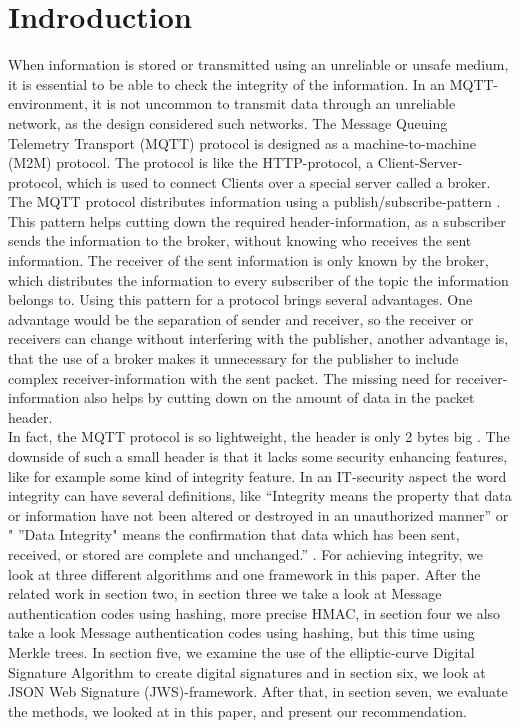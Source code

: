 \section{Indroduction}

When information is stored or transmitted using an unreliable or unsafe medium, it is essential to be able to check the integrity of the information. In an MQTT-environment, it is not uncommon to transmit data through an unreliable network, as the design considered such networks. The Message Queuing Telemetry Transport (MQTT) protocol is designed as a machine-to-machine (M2M) protocol. The protocol is like the HTTP-protocol, a Client-Server-protocol, which is used to connect Clients over a special server called a broker. The MQTT protocol distributes information using a publish/subscribe-pattern \cite{LIMI}. This pattern helps cutting down the required header-information, as a subscriber sends the information to the broker, without knowing who receives the sent information. The receiver of the sent information is only known by the broker, which distributes the information to every subscriber of the topic the information belongs to. Using this pattern for a protocol brings several advantages. One advantage would be the separation of sender and receiver, so the receiver or receivers can change without interfering with the publisher, another advantage is, that the use of a broker makes it unnecessary for the publisher to include complex receiver-information with the sent packet. The missing need for receiver-information also helps by cutting down on the amount of data in the packet header. \\
In fact, the MQTT protocol is so lightweight, the header is only 2 bytes big \cite{IBM}. The downside of such a small header is that it lacks some security enhancing features, like for example some kind of integrity feature. In an IT-security aspect the word integrity can have several definitions, like “Integrity means the property that data or information have not been altered or destroyed in an unauthorized manner”\cite{INTI1} or " ”Data Integrity" means the confirmation that data which has been sent, received, or stored are complete and unchanged.” \cite{INTI2}. For achieving integrity, we look at three different algorithms and one framework in this paper. After the related work in section two, in section three we take a look at Message authentication codes using hashing, more precise HMAC, in section four we also take a look Message authentication codes using hashing, but this time using Merkle trees. In section five, we examine the use of the elliptic-curve Digital Signature Algorithm to create digital signatures and in section six, we look at JSON Web Signature (JWS)-framework. After that, in section seven, we evaluate the methods, we looked at in this paper, and present our recommendation.
